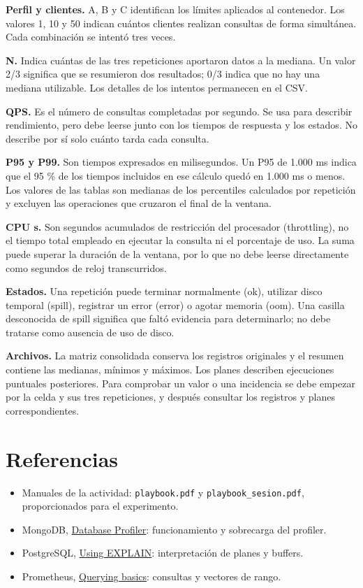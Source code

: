 \documentclass[12pt,letterpaper]{article}
\begin{document}
\textbf{Perfil y clientes.} A, B y C identifican los límites aplicados al contenedor. Los valores 1, 10 y 50 indican cuántos clientes realizan consultas de forma simultánea. Cada combinación se intentó tres veces.

\textbf{N.} Indica cuántas de las tres repeticiones aportaron datos a la mediana. Un valor 2/3 significa que se resumieron dos resultados; 0/3 indica que no hay una mediana utilizable. Los detalles de los intentos permanecen en el CSV.

\textbf{QPS.} Es el número de consultas completadas por segundo. Se usa para describir rendimiento, pero debe leerse junto con los tiempos de respuesta y los estados. No describe por sí solo cuánto tarda cada consulta.

\textbf{P95 y P99.} Son tiempos expresados en milisegundos. Un P95 de 1.000 ms indica que el 95 \% de los tiempos incluidos en ese cálculo quedó en 1.000 ms o menos. Los valores de las tablas son medianas de los percentiles calculados por repetición y excluyen las operaciones que cruzaron el final de la ventana.

\textbf{CPU s.} Son segundos acumulados de restricción del procesador (throttling), no el tiempo total empleado en ejecutar la consulta ni el porcentaje de uso. La suma puede superar la duración de la ventana, por lo que no debe leerse directamente como segundos de reloj transcurridos.

\textbf{Estados.} Una repetición puede terminar normalmente (ok), utilizar disco temporal (spill), registrar un error (error) o agotar memoria (oom). Una casilla desconocida de spill significa que faltó evidencia para determinarlo; no debe tratarse como ausencia de uso de disco.

\textbf{Archivos.} La matriz consolidada conserva los registros originales y el resumen contiene las medianas, mínimos y máximos. Los planes describen ejecuciones puntuales posteriores. Para comprobar un valor o una incidencia se debe empezar por la celda y sus tres repeticiones, y después consultar los registros y planes correspondientes.

\section*{Referencias}
\begin{itemize}
\item Manuales de la actividad: \texttt{playbook.pdf} y \texttt{playbook\_\allowbreak{}sesion.pdf}, proporcionados para el experimento.
\item MongoDB, \href{https://www.mongodb.com/docs/manual/tutorial/manage-the-database-profiler/}{Database Profiler}: funcionamiento y sobrecarga del profiler.
\item PostgreSQL, \href{https://www.postgresql.org/docs/current/using-explain.html}{Using EXPLAIN}: interpretación de planes y buffers.
\item Prometheus, \href{https://prometheus.io/docs/prometheus/latest/querying/basics/}{Querying basics}: consultas y vectores de rango.
\end{itemize}
\end{document}
